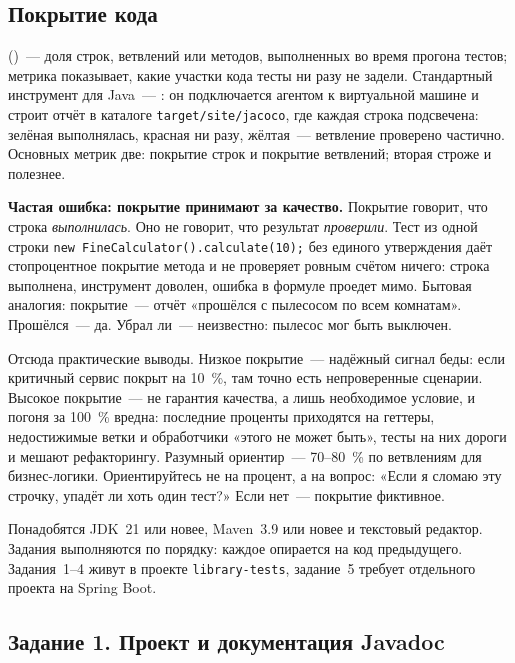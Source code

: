 \subsection{Покрытие кода}

 ()~--- доля строк, ветвлений или методов, выполненных во время прогона тестов; метрика показывает, какие участки кода тесты ни разу не задели. Стандартный инструмент для Java~--- : он подключается агентом к виртуальной машине и строит отчёт в каталоге \texttt{target/site/jacoco}, где каждая строка подсвечена: зелёная выполнялась, красная ни разу, жёлтая~--- ветвление проверено частично. Основных метрик две: покрытие строк и покрытие ветвлений; вторая строже и полезнее.

\begin{oshibka}
\textbf{Частая ошибка: покрытие принимают за качество.} Покрытие говорит, что строка \emph{выполнилась}. Оно не говорит, что результат \emph{проверили}. Тест из одной строки \texttt{new FineCalculator().calculate(10);} без единого утверждения даёт стопроцентное покрытие метода и не проверяет ровным счётом ничего: строка выполнена, инструмент доволен, ошибка в формуле проедет мимо. Бытовая аналогия: покрытие~--- отчёт «прошёлся с пылесосом по всем комнатам». Прошёлся~--- да. Убрал ли~--- неизвестно: пылесос мог быть выключен.
\end{oshibka}

Отсюда практические выводы. Низкое покрытие~--- надёжный сигнал беды: если критичный сервис покрыт на 10~\%, там точно есть непроверенные сценарии. Высокое покрытие~--- не гарантия качества, а лишь необходимое условие, и погоня за 100~\% вредна: последние проценты приходятся на геттеры, недостижимые ветки и обработчики «этого не может быть», тесты на них дороги и мешают рефакторингу. Разумный ориентир~--- 70--80~\% по ветвлениям для бизнес-логики. Ориентируйтесь не на процент, а на вопрос: «Если я сломаю эту строчку, упадёт ли хоть один тест?» Если нет~--- покрытие фиктивное.

\praktikum{}

Понадобятся JDK~21 или новее, Maven~3.9 или новее и текстовый редактор. Задания выполняются по порядку: каждое опирается на код предыдущего. Задания~1--4 живут в проекте \texttt{library-tests}, задание~5 требует отдельного проекта на Spring Boot.

\subsection*{Задание 1. Проект и документация Javadoc}

